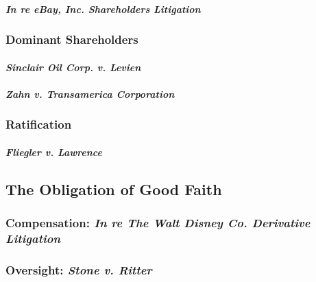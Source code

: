 
\paragraph{\emph{In re eBay, Inc. Shareholders Litigation}}


\subsubsection{Dominant Shareholders}

\paragraph{\emph{Sinclair Oil Corp. v. Levien}}


\paragraph{\emph{Zahn v. Transamerica Corporation}}


\subsubsection{Ratification}

\paragraph{\emph{Fliegler v. Lawrence}}


\subsection{The Obligation of Good Faith}

\subsubsection{Compensation: \emph{In re The Walt Disney Co. Derivative Litigation}}


\subsubsection{Oversight: \emph{Stone v. Ritter}}

